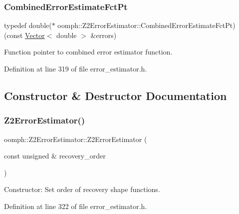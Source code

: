 \subsubsection{\texorpdfstring{Combined\+Error\+Estimate\+Fct\+Pt}{CombinedErrorEstimateFctPt}}
{\footnotesize\ttfamily typedef double($\ast$ oomph\+::\+Z2\+Error\+Estimator\+::\+Combined\+Error\+Estimate\+Fct\+Pt) (const \hyperlink{classoomph_1_1Vector}{Vector}$<$ double $>$ \&errors)}



Function pointer to combined error estimator function. 



Definition at line 319 of file error\+\_\+estimator.\+h.



\subsection{Constructor \& Destructor Documentation}
\mbox{\label{classoomph_1_1Z2ErrorEstimator_a1cb0328af843a8bebf5333045cea4553}} 
\subsubsection{\texorpdfstring{Z2\+Error\+Estimator()}{Z2ErrorEstimator()}\hspace{0.1cm}{\footnotesize\ttfamily [1/3]}}
{\footnotesize\ttfamily oomph\+::\+Z2\+Error\+Estimator\+::\+Z2\+Error\+Estimator (\begin{DoxyParamCaption}\item[{const unsigned \&}]{recovery\+\_\+order }\end{DoxyParamCaption})\hspace{0.3cm}{\ttfamily [inline]}}



Constructor\+: Set order of recovery shape functions. 



Definition at line 322 of file error\+\_\+estimator.\+h.

\mbox{\label{classoomph_1_1Z2ErrorEstimator_a35186eeb792bf2b948239d19b2697ca0}} 
